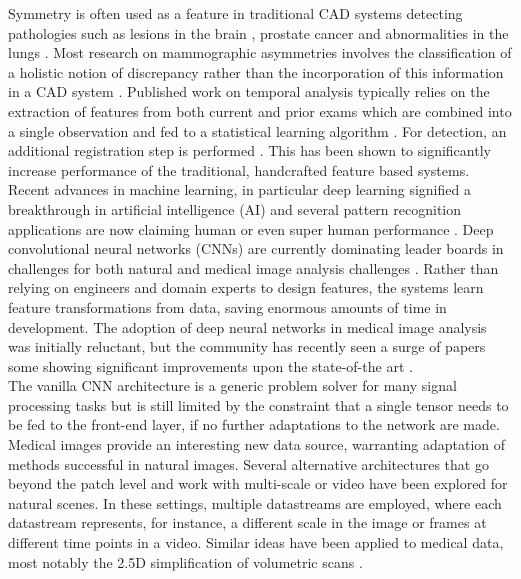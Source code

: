 \documentclass[12pt]{spieman}  %
\begin{document}
Symmetry is often used as a feature in traditional CAD systems detecting pathologies such as lesions in the brain \cite{Lui09h}, prostate cancer \cite{Litj14c} and abnormalities in the lungs \cite{Ginn01a}. Most research on mammographic asymmetries involves the classification of a holistic notion of discrepancy rather than the incorporation of this information in a CAD system \cite{Ferr01, Cast15}. Published work on temporal analysis typically relies on the extraction of features from both current and prior exams which are combined into a single observation and fed to a statistical learning algorithm \cite{Hadj01a, Timp07}. For detection, an additional registration step is performed \cite{Timp06}. This has been shown to significantly increase performance of the traditional, handcrafted feature based systems. \\

Recent advances in machine learning, in particular deep learning \cite{Lecu98, Hint06a, Beng13, Schm15a} signified a breakthrough in artificial intelligence (AI) and several pattern recognition applications are now claiming human or even super human performance \cite{Cire12a, Mnih15, Ioff15, Silv16}. Deep convolutional neural networks (CNNs) \cite{Lecu98} are currently dominating leader boards in challenges for both natural \cite{Russ14a} and medical image analysis challenges \cite{Cire13a, Ronn15, Wang16a}. Rather than relying on engineers and domain experts to design features, the systems learn feature transformations from data, saving enormous amounts of time in development. The adoption of deep neural networks in medical image analysis was initially reluctant, but the community has recently seen a surge of papers \cite{Litj17} some showing significant improvements upon the state-of-the art \cite{Roth16, Kooi16, Seti16, Grin16b}. \\

The vanilla CNN architecture is a generic problem solver for many signal processing tasks but is still limited by the constraint that a single tensor needs to be fed to the front-end layer, if no further adaptations to the network are made. Medical images provide an interesting new data source, warranting adaptation of methods successful in natural images. Several alternative architectures that go beyond the patch level and work with multi-scale \cite{Fara13a} or video \cite{Karp14, Neve14, Simo14a} have been explored for natural scenes. In these settings, multiple datastreams are employed, where each datastream represents, for instance, a different scale in the image or frames at different time points in a video. Similar ideas have been applied to medical data, most notably the 2.5D simplification of volumetric scans \cite{Pras13a, Roth14, Roth16}. \\
\end{document}
